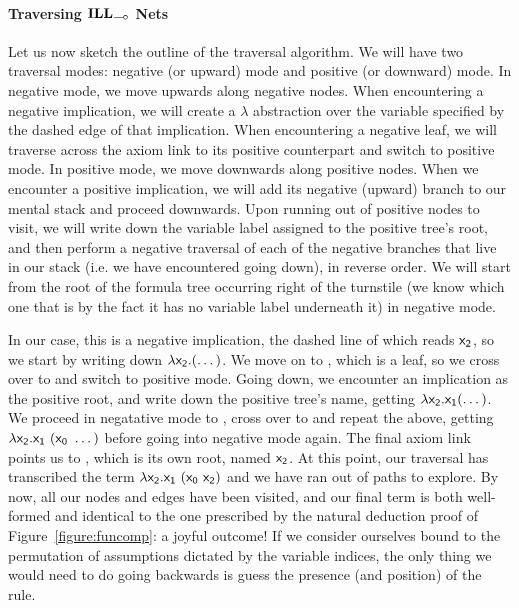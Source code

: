\paragraph{Traversing $\ILL_{\li}$ Nets}
Let us now sketch the outline of the traversal algorithm.
We will have two traversal modes: negative (or upward) mode and positive (or downward) mode.
In negative mode, we move upwards along negative nodes.
When encountering a negative implication, we will create a $\lambda$ abstraction over the variable specified by the dashed edge of that implication.
When encountering a negative leaf, we will traverse across the axiom link to its positive counterpart and switch to positive mode.
In positive mode, we move downwards along positive nodes.
When we encounter a positive implication, we will add  its negative (upward) branch to our mental stack and proceed downwards.
Upon running out of positive nodes to visit, we will write down the variable label assigned to the positive tree's root, and then perform a negative traversal of each of the negative branches that live in our stack (i.e. we have encountered going down), in reverse order.
We will start from the root of the formula tree occurring right of the turnstile (we know which one that is by the fact it has no variable label underneath it) in negative mode.

In our case, this is a negative implication, the dashed line of which reads $\mathsf{x_2}$, so we start by writing down $\mathsf{\lambda x_2. (\dots)}$. 
We move on to , which is a leaf, so we cross over to  and switch to positive mode. Going down, we encounter an implication as the positive root, and write down the positive tree's name, getting $\mathsf{\lambda x_2.x_1 (\dots)}$.
We proceed in negatative mode to , cross over to  and repeat the above, getting $\mathsf{\lambda x_2.x_1~(x_0~\dots)}$ before going into negative mode again.
The final axiom link points us to , which is its own root, named $\mathsf{x_2}$.
At this point, our traversal has transcribed the term $\mathsf{\lambda x_2.x_1~(x_0~x_2)}$ and we have ran out of paths to explore.
By now, all our nodes and edges have been visited, and our final term is both well-formed and identical to the one prescribed by the natural deduction proof of Figure~\ref{figure:funcomp}: a joyful outcome!
If we consider ourselves bound to the permutation of assumptions dictated by the variable indices, the only thing we would need to do going backwards is guess the presence (and position) of the \Exchange{} rule.


